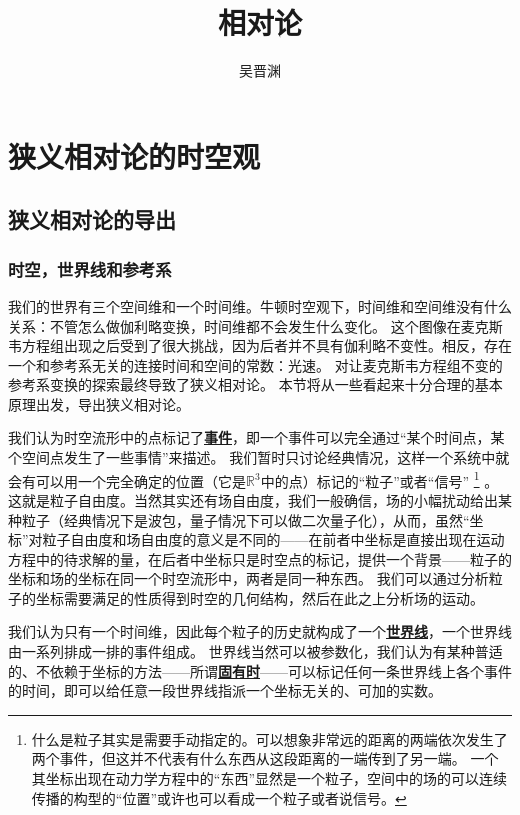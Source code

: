 \documentclass[hyperref, UTF8, a4paper]{ctexart}
\title{相对论}
\author{吴晋渊}
\newcommand*{\concept}[1]{\underline{\textbf{#1}}}
\begin{document}
\maketitle

\section{狭义相对论的时空观}

\subsection{狭义相对论的导出}

\subsubsection{时空，世界线和参考系}

我们的世界有三个空间维和一个时间维。牛顿时空观下，时间维和空间维没有什么关系：不管怎么做伽利略变换，时间维都不会发生什么变化。
这个图像在麦克斯韦方程组出现之后受到了很大挑战，因为后者并不具有伽利略不变性。相反，存在一个和参考系无关的连接时间和空间的常数：光速。
对让麦克斯韦方程组不变的参考系变换的探索最终导致了狭义相对论。
本节将从一些看起来十分合理的基本原理出发，导出狭义相对论。

我们认为时空流形中的点标记了\concept{事件}，即一个事件可以完全通过“某个时间点，某个空间点发生了一些事情”来描述。
我们暂时只讨论经典情况，这样一个系统中就会有可以用一个完全确定的位置（它是$\mathbb{R}^3$中的点）标记的“粒子”或者“信号”%
\footnote{什么是粒子其实是需要手动指定的。可以想象非常远的距离的两端依次发生了两个事件，但这并不代表有什么东西从这段距离的一端传到了另一端。
一个其坐标出现在动力学方程中的“东西”显然是一个粒子，空间中的场的可以连续传播的构型的“位置”或许也可以看成一个粒子或者说信号。
}%
。
这就是粒子自由度。当然其实还有场自由度，我们一般确信，场的小幅扰动给出某种粒子（经典情况下是波包，量子情况下可以做二次量子化），从而，虽然“坐标”对粒子自由度和场自由度的意义是不同的——在前者中坐标是直接出现在运动方程中的待求解的量，在后者中坐标只是时空点的标记，提供一个背景——粒子的坐标和场的坐标在同一个时空流形中，两者是同一种东西。
我们可以通过分析粒子的坐标需要满足的性质得到时空的几何结构，然后在此之上分析场的运动。

我们认为只有一个时间维，因此每个粒子的历史就构成了一个\concept{世界线}，一个世界线由一系列排成一排的事件组成。
世界线当然可以被参数化，我们认为有某种普适的、不依赖于坐标的方法——所谓\concept{固有时}——可以标记任何一条世界线上各个事件的时间，即可以给任意一段世界线指派一个坐标无关的、可加的实数。
\end{document}
